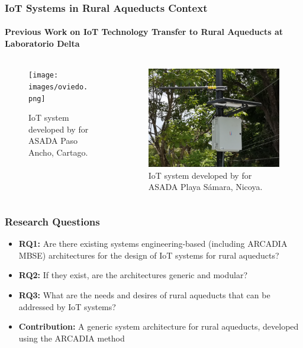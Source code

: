 \documentclass[aspectratio=169]{beamer}
\begin{document}
\begin{frame}
    \frametitle{\small IoT Systems in Rural Aqueducts Context}
    \framesubtitle{Previous Work on IoT Technology Transfer to Rural Aqueducts at Laboratorio Delta}

    \begin{columns}[T] %
        \begin{column}{0.5\textwidth}
            \begin{figure}
                \texttt{[image: images/oviedo.png]}
                \caption{IoT system developed by \cite{Oviedo2024} for ASADA Paso Ancho, Cartago.}
            \end{figure}
        \end{column}
        \begin{column}{0.5\textwidth}
            \begin{figure}
                \includegraphics[width=0.8\columnwidth]{images/solorzano.png}
                \caption{IoT system developed by \cite{Solorzano2021} for ASADA Playa Sámara, Nicoya.}
            \end{figure}
        \end{column}
    \end{columns}
\end{frame}

\begin{frame}
    \frametitle{Research Questions}

    \begin{itemize}
        \item \textbf{RQ1:} Are there existing systems engineering-based (including ARCADIA MBSE) architectures for the design of IoT systems for rural aqueducts?
        \item \textbf{RQ2:} If they exist, are the architectures generic and modular?
        \item \textbf{RQ3:} What are the needs and desires of rural aqueducts that can be addressed by IoT systems?
        \item \textbf{Contribution:} A generic system architecture for rural aqueducts, developed using the ARCADIA method
    \end{itemize} 
\end{frame}
\end{document}
